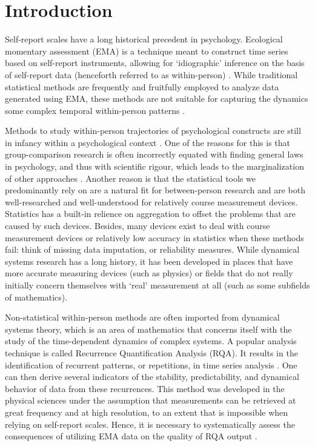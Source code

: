 \documentclass[utf8]{FrontiersinVancouver}
\begin{document}
\section{Introduction}
Self-report scales have a long historical precedent in psychology. Ecological momentary assessment (EMA) is a technique meant to construct time series based on self-report instruments, allowing for `idiographic' inference on the basis of self-report data (henceforth referred to as within-person) \citep{connerExperienceSamplingMethods2009}. While traditional statistical methods are frequently and fruitfully employed to analyze data generated using EMA, these methods are not suitable for capturing the dynamics some complex temporal within-person patterns \citep{olthofPsychologicalDynamicsAre2020}. 

Methods to study within-person trajectories of psychological constructs are still in infancy within a psychological context \citep{molenaarManifestoPsychologyIdiographic2004}. One of the reasons for this is that group-comparison research is often incorrectly equated with finding general laws in psychology, and thus with scientific rigour, which leads to the marginalization of other approaches \citep{hamakerWhyResearchersShould2012, lamiellProblemIndividualityScientific2021}. Another reason is that the statistical tools we predominantly rely on are a natural fit for between-person research and are both well-researched and well-understood for relatively course measurement devices. Statistics has a built-in relience on aggregation to offset the problems that are caused by such devices. Besides, many devices exist to deal with course measurement devices or relatively low accuracy in statistics when these methods fail: think of missing data imputation, or reliability measures. While dynamical systems research has a long history, it has been developed in places that have more accurate measuring devices (such as physics) or fields that do not really initially concern themselves with `real' measurement at all (such as some subfields of mathematics). 

Non-statistical within-person methods are often imported from dynamical systems theory, which is an area of mathematics that concerns itself with the study of the time-dependent dynamics of complex systems. A popular analysis technique is called Recurrence Quantification Analysis (RQA). It results in the identification of recurrent patterns, or repetitions, in time series analysis \citep{webber2005recurrence}. One can then derive several indicators of the stability, predictability, and dynamical behavior of data from these recurrences. This method was developed in the physical sciences under the assumption that measurements can be retrieved at great frequency and at high resolution, to an extent that is impossible when relying on self-report scales. Hence, it is necessary to systematically assess the consequences of utilizing EMA data on the quality of RQA output \citep{haslbeckRecoveringWithinpersonDynamics2022}. 
\end{document}
